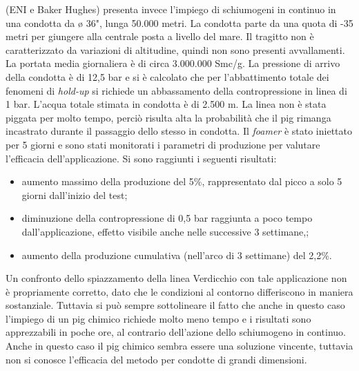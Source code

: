 \textcite{passucci2015foamer} (ENI e Baker Hughes) presenta invece l'impiego di schiumogeni in continuo in una condotta da ø 36", lunga 50.000 metri. La condotta parte da una quota di -35 metri per giungere alla centrale posta a livello del mare. Il tragitto non è caratterizzato da variazioni di altitudine, quindi non sono presenti avvallamenti. La portata media giornaliera è di circa 3.000.000 Smc/g. La pressione di arrivo della condotta è di 12,5 bar e si è calcolato che per l'abbattimento totale dei fenomeni di \textit{hold-up} si richiede un abbassamento della contropressione in linea di 1 bar. L'acqua totale stimata in condotta è di 2.500 m. La linea non è stata piggata per molto tempo, perciò risulta alta la probabilità che il pig rimanga incastrato durante il passaggio dello stesso in condotta. Il \textit{foamer} è stato iniettato per 5 giorni e sono stati monitorati i parametri di produzione per valutare l'efficacia dell'applicazione. Si sono raggiunti i seguenti risultati:
\begin{itemize}
\item aumento massimo della produzione del 5\%, rappresentato dal picco a solo 5 giorni dall'inizio del test;
\item diminuzione della contropressione di 0,5 bar raggiunta a poco tempo dall'applicazione, effetto visibile anche nelle successive 3 settimane,;
\item aumento della produzione cumulativa (nell'arco di 3 settimane) del 2,2\%.
\end{itemize}
Un confronto dello spiazzamento della linea Verdicchio con tale applicazione non è propriamente corretto, dato che le condizioni al contorno differiscono in maniera sostanziale. Tuttavia si può sempre sottolineare il fatto che anche in questo caso l'impiego di un pig chimico richiede molto meno tempo e i risultati sono apprezzabili in poche ore, al contrario dell'azione dello schiumogeno in continuo. Anche in questo caso il pig chimico sembra essere una soluzione vincente, tuttavia non si conosce l'efficacia del metodo per condotte di grandi dimensioni.

